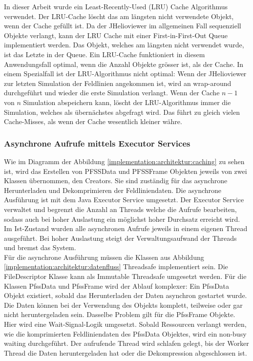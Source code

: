 In dieser Arbeit wurde ein Least-Recently-Used (LRU) Cache Algorithmus verwendet. Der LRU-Cache löscht das am längsten nicht verwendete Objekt, wenn der Cache gefüllt ist. Da der JHelioviewer im allgemeinen Fall sequenziell Objekte verlangt, kann der LRU Cache mit einer First-in-First-Out Queue implementiert werden. Das Objekt, welches am längsten nicht  verwendet wurde, ist das Letzte in der Queue. Ein LRU-Cache funktioniert in diesem Anwendungsfall optimal, wenn die Anzahl Objekte grösser ist, als der Cache. In einem Spezialfall ist der LRU-Algorithmus nicht optimal: Wenn der JHelioviewer zur letzten Simulation der Feldlinien angekommen ist, wird an wrap-around durchgeführt und wieder die erste Simulation verlangt. Wenn der Cache $n-1$ von $n$ Simulation abspeichern kann, löscht der LRU-Algorithmus immer die Simulation, welches als übernächstes abgefragt wird. Das führt zu gleich vielen Cache-Misses, als wenn der Cache wesentlich kleiner währe.

\subsubsection{Asynchrone Aufrufe mittels Executor Services}
Wie im Diagramm der Abbildung \ref{implementation:architektur:caching} zu sehen ist, wird das Erstellen von PFSSData und PFSSFrame Objekten jeweils von zwei Klassen übernommen, den Creators. Sie sind zuständig für das asynchrone Herunterladen und Dekomprimieren der Feldliniendaten. Die asynchrone Ausführung ist mit dem Java Executor Service umgesetzt. Der Executor Service verwaltet und begrenzt die Anzahl an Threads welche die Aufrufe bearbeiten, sodass auch bei hoher Auslastung ein möglichst hoher Durchsatz erreicht wird. Im Ist-Zustand wurden alle asynchronen Aufrufe jeweils in einem eigenen Thread ausgeführt. Bei hoher Auslastung steigt der Verwaltungsaufwand der Threads und bremst das System.\\
Für die asynchrone Ausführung müssen die Klassen aus Abbildung \ref{implementation:architektur:datenfluss} Threadsafe implementiert sein. Die FileDescriptor Klasse kann als Immutable Threadsafe umgesetzt werden. Für die Klassen PfssData und PfssFrame wird der Ablauf komplexer: Ein PfssData Objekt existiert, sobald das Herunterladen der Daten asynchron gestartet wurde. Die Daten können bei der Verwendung des Objekts komplett, teilweise oder gar nicht heruntergeladen sein. Dasselbe Problem gilt für die PfssFrame Objekte. Hier wird eine Wait-Signal-Logik umgesetzt. Sobald Ressourcen verlangt werden, wie die komprimierten Feldliniendaten des PfssData Objektes, wird ein non-busy waiting durchgeführt. Der aufrufende Thread wird schlafen gelegt, bis der Worker Thread die Daten heruntergeladen hat oder die Dekompression abgeschlossen ist.
